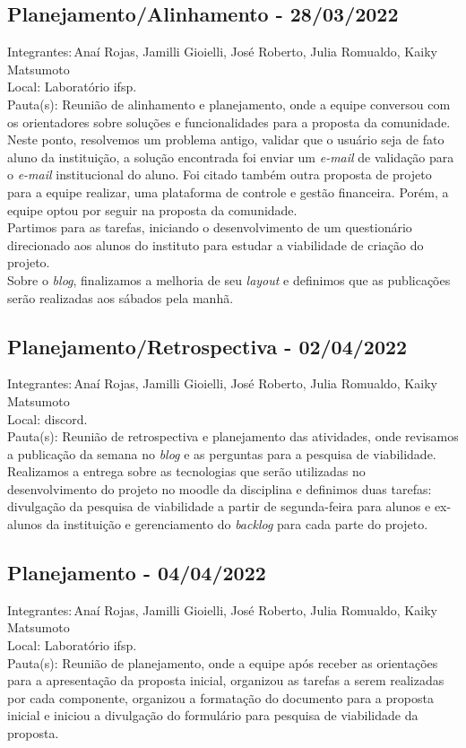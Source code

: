 \subsection{Planejamento/Alinhamento - 28/03/2022}
\noindent Integrantes:\,Anaí Rojas, Jamilli Gioielli, José Roberto, Julia Romualdo, Kaiky Matsumoto\\
Local: Laboratório \acs{ifsp}.\\
Pauta(s): Reunião de alinhamento e planejamento, onde a equipe conversou com os orientadores sobre soluções e funcionalidades para a proposta da comunidade. Neste ponto, resolvemos um problema antigo, validar que o usuário seja de fato aluno da instituição, a solução encontrada foi enviar um \textsl{e-mail} de validação para o \textsl{e-mail} institucional do aluno. Foi citado também outra proposta de projeto para a equipe realizar, uma plataforma de controle e gestão financeira. Porém, a equipe optou por seguir na proposta da comunidade.\\
Partimos para as tarefas, iniciando o desenvolvimento de um questionário direcionado aos alunos do instituto para estudar a viabilidade de criação do projeto.\\
Sobre o \textsl{blog}, finalizamos a melhoria de seu \textsl{layout} e definimos que as publicações serão realizadas aos sábados pela manhã.

\subsection{Planejamento/Retrospectiva - 02/04/2022}
\noindent Integrantes:\,Anaí Rojas, Jamilli Gioielli, José Roberto, Julia Romualdo, Kaiky Matsumoto \\
Local: \gls{discord}.\\
Pauta(s): Reunião de retrospectiva e planejamento das atividades, onde revisamos a publicação da semana no \textsl{blog} e as perguntas para a pesquisa de viabilidade. Realizamos a entrega sobre as tecnologias que serão utilizadas no desenvolvimento do projeto no \gls{moodle} da disciplina e definimos duas tarefas: divulgação da pesquisa de viabilidade a partir de segunda-feira para alunos e ex-alunos da instituição e gerenciamento do \textsl{backlog} para cada parte do projeto.

\subsection{Planejamento - 04/04/2022}
\noindent Integrantes:\,Anaí Rojas, Jamilli Gioielli, José Roberto, Julia Romualdo, Kaiky Matsumoto \\
Local: Laboratório \acs{ifsp}.\\
Pauta(s): Reunião de planejamento, onde a equipe após receber as orientações para a apresentação da proposta inicial, organizou as tarefas a serem realizadas por cada componente, organizou a formatação do documento para a proposta inicial e iniciou a divulgação do formulário para pesquisa de viabilidade da proposta.

